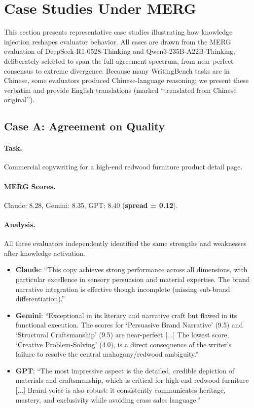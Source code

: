 \documentclass{article}
\begin{document}
\section{Case Studies Under MERG}
\label{app:case_studies}

This section presents representative case studies illustrating how knowledge injection reshapes evaluator behavior. All cases are drawn from the MERG evaluation of DeepSeek-R1-0528-Thinking and Qwen3-235B-A22B-Thinking, deliberately selected to span the full agreement spectrum, from near-perfect consensus to extreme divergence. Because many WritingBench tasks are in Chinese, some evaluators produced Chinese-language reasoning; we present these verbatim and provide English translations (marked ``translated from Chinese original'').

\subsection{Case A: Agreement on Quality}
\label{case:agreement_quality}

\paragraph{Task.} Commercial copywriting for a high-end redwood furniture product detail page.

\paragraph{MERG Scores.} Claude: 8.28, Gemini: 8.35, GPT: 8.40 (\textbf{spread = 0.12}).

\paragraph{Analysis.} All three evaluators independently identified the same strengths and weaknesses after knowledge activation.
\begin{itemize}
    \item \textbf{Claude}: ``This copy achieves strong performance across all dimensions, with particular excellence in sensory persuasion and material expertise. The brand narrative integration is effective though incomplete (missing sub-brand differentiation).''
    \item \textbf{Gemini}: ``Exceptional in its literary and narrative craft but flawed in its functional execution. The scores for `Persuasive Brand Narrative' (9.5) and `Structural Craftsmanship' (9.5) are near-perfect [...] The lowest score, `Creative Problem-Solving' (4.0), is a direct consequence of the writer's failure to resolve the central mahogany/redwood ambiguity.''
    \item \textbf{GPT}: ``The most impressive aspect is the detailed, credible depiction of materials and craftsmanship, which is critical for high-end redwood furniture [...] Brand voice is also robust: it consistently communicates heritage, mastery, and exclusivity while avoiding crass sales language.''
\end{itemize}
\end{document}
